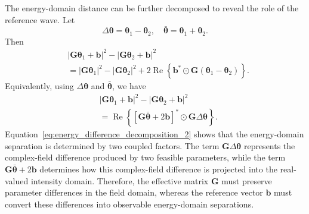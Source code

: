 \documentclass[journal]{IEEEtran}
\begin{document}
The energy-domain distance can be further decomposed to reveal the role of the reference wave. 
Let
\begin{equation}
\Delta\boldsymbol{\theta}
=
\boldsymbol{\theta}_1-\boldsymbol{\theta}_2,
\quad
\bar{\boldsymbol{\theta}}
=
\boldsymbol{\theta}_1+\boldsymbol{\theta}_2.
\end{equation}
Then
\begin{equation}
\begin{aligned}
&|\mathbf{G}\boldsymbol{\theta}_1+\mathbf{b}|^2
-
|\mathbf{G}\boldsymbol{\theta}_2+\mathbf{b}|^2 \\
&=
|\mathbf{G}\boldsymbol{\theta}_1|^2
-
|\mathbf{G}\boldsymbol{\theta}_2|^2
+
2\operatorname{Re}
\left\{
\mathbf{b}^*
\odot
\mathbf{G}
(\boldsymbol{\theta}_1-\boldsymbol{\theta}_2)
\right\}.
\end{aligned}
\label{eq:energy_difference_decomposition_1}
\end{equation}
Equivalently, using $\Delta\boldsymbol{\theta}$ and $\bar{\boldsymbol{\theta}}$, we have
\begin{equation}
\begin{aligned}
&|\mathbf{G}\boldsymbol{\theta}_1+\mathbf{b}|^2
-
|\mathbf{G}\boldsymbol{\theta}_2+\mathbf{b}|^2 \\
&=
\operatorname{Re}
\left\{
\left[
\mathbf{G}\bar{\boldsymbol{\theta}}
+
2\mathbf{b}
\right]^*
\odot
\mathbf{G}\Delta\boldsymbol{\theta}
\right\}.
\end{aligned}
\label{eq:energy_difference_decomposition_2}
\end{equation}
Equation~\eqref{eq:energy_difference_decomposition_2} shows that the energy-domain separation is determined by two coupled factors. 
The term $\mathbf{G}\Delta\boldsymbol{\theta}$ represents the complex-field difference produced by two feasible parameters, while the term $\mathbf{G}\bar{\boldsymbol{\theta}}+2\mathbf{b}$ determines how this complex-field difference is projected into the real-valued intensity domain. 
Therefore, the effective matrix $\mathbf{G}$ must preserve parameter differences in the field domain, whereas the reference vector $\mathbf{b}$ must convert these differences into observable energy-domain separations.
\end{document}
